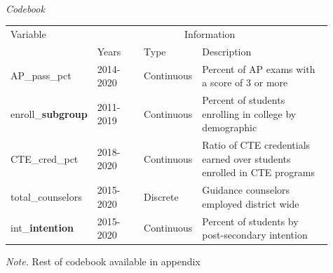 \documentclass[10pt]{beamer}
\begin{document}
\begin{frame}
    \begin{threeparttable}
        \caption{\\\textit{Codebook}}
        \begin{tabular}{ p{0.2\linewidth} p{0.15\linewidth} p{0.13\linewidth} p{0.43\linewidth}}
            \toprule
            Variable & \multicolumn{3}{c}{Information} \\
            \cmidrule(r){2-4}
            &   Years    &    Type                 &  Description \\ 
            \midrule
            AP\_pass\_pct & 2014-2020 &  Continuous     &   Percent of AP exams with a score of 3 or more     \\
            enroll\_\textbf{subgroup}& 2011-2019   &  Continuous     &   Percent of students enrolling in college by demographic           \\
            CTE\_cred\_pct  & 2018-2020  &  Continuous     &  Ratio of CTE credentials earned over students enrolled in CTE programs          \\
            total\_counselors & 2015-2020  &  Discrete       &  Guidance counselors employed district wide  \\
            int\_\textbf{intention} & 2015-2020 &  Continuous                   &  Percent of students by post-secondary intention           \\
            \midrule
        \end{tabular}
        \small \emph{Note.} Rest of codebook available in appendix 
        \end{threeparttable}
\end{frame}
\end{document}
